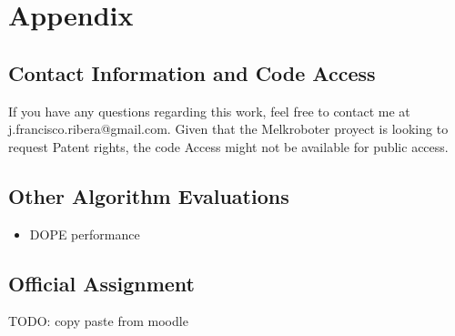 \chapter{Appendix}\label{sec:chapAppendix}

\section{Contact Information and Code Access}
If you have any questions regarding this work, feel free to contact me at j.francisco.ribera@gmail.com. Given that the Melkroboter proyect is looking to request Patent rights, the code Access might not be available for public access.
\section{Other Algorithm Evaluations}
    \begin{itemize}
        \item DOPE performance
    \end{itemize}
\section{Official Assignment}
TODO: copy paste from moodle